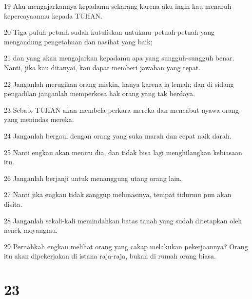 \par 19 Aku mengajarkannya kepadamu sekarang karena aku ingin kau menaruh kepercayaanmu kepada TUHAN.
\par 20 Tiga puluh petuah sudah kutuliskan untukmu--petuah-petuah yang mengandung pengetahuan dan nasihat yang baik;
\par 21 dan yang akan mengajarkan kepadamu apa yang sungguh-sungguh benar. Nanti, jika kau ditanyai, kau dapat memberi jawaban yang tepat.
\par 22 Janganlah merugikan orang miskin, hanya karena ia lemah; dan di sidang pengadilan janganlah memperkosa hak orang yang tak berdaya.
\par 23 Sebab, TUHAN akan membela perkara mereka dan mencabut nyawa orang yang menindas mereka.
\par 24 Janganlah bergaul dengan orang yang suka marah dan cepat naik darah.
\par 25 Nanti engkau akan meniru dia, dan tidak bisa lagi menghilangkan kebiasaan itu.
\par 26 Janganlah berjanji untuk menanggung utang orang lain.
\par 27 Nanti jika engkau tidak sanggup melunasinya, tempat tidurmu pun akan disita.
\par 28 Janganlah sekali-kali memindahkan batas tanah yang sudah ditetapkan oleh nenek moyangmu.
\par 29 Pernahkah engkau melihat orang yang cakap melakukan pekerjaannya? Orang itu akan dipekerjakan di istana raja-raja, bukan di rumah orang biasa.

\chapter{23}

